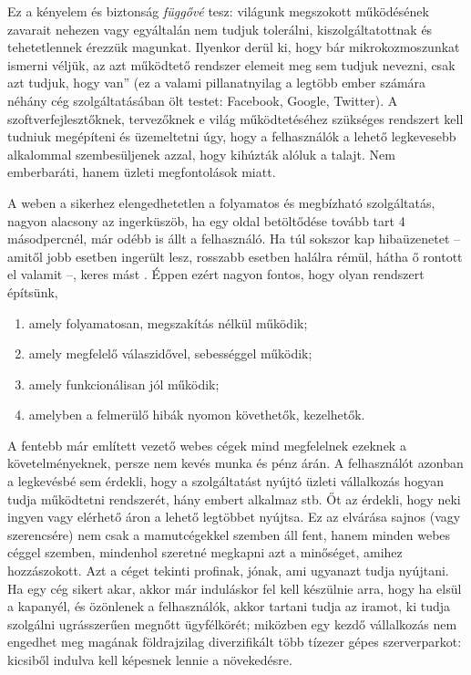 \documentclass[12pt, a4paper, oneside]{book}
\begin{document}
Ez a kényelem és biztonság \textit{függővé} tesz: világunk megszokott
működésének zavarait nehezen vagy egyáltalán nem tudjuk tolerálni,
kiszolgáltatottnak és tehetetlennek érezzük magunkat. Ilyenkor derül ki, hogy
bár mikrokozmoszunkat ismerni véljük, az azt működtető rendszer elemeit meg sem
tudjuk nevezni, csak azt tudjuk, hogy \glqq{}van\textquotedblright{} (ez a
valami pillanatnyilag a legtöbb ember számára néhány cég szolgáltatásában ölt
testet: Facebook, Google, Twitter). A szoftverfejlesztőknek, tervezőknek e
világ működtetéséhez szükséges rendszert kell tudniuk megépíteni és
üzemeltetni úgy, hogy a felhasználók a lehető legkevesebb alkalommal
szembesüljenek azzal, hogy kihúzták alóluk a talajt. Nem emberbaráti, hanem
üzleti megfontolások miatt.

A weben a sikerhez elengedhetetlen a folyamatos és megbízható szolgáltatás,
nagyon alacsony az ingerküszöb, ha egy oldal betöltődése tovább tart 4
másodpercnél, már odébb is állt a felhasználó.  Ha túl sokszor kap hibaüzenetet --
amitől jobb esetben ingerült lesz, rosszabb esetben halálra rémül, hátha ő
rontott el valamit --, keres mást \citep{AkamaiReport}.  Éppen ezért nagyon
fontos, hogy olyan rendszert építsünk,

\begin{enumerate} 
  \item amely folyamatosan, megszakítás nélkül működik;
  \item amely megfelelő válaszidővel, sebességgel működik;
  \item amely funkcionálisan jól működik;
  \item amelyben a felmerülő hibák nyomon követhetők, kezelhetők.
\end{enumerate}

A fentebb már említett vezető webes cégek mind megfelelnek ezeknek a
követelményeknek, persze nem kevés munka és pénz árán. A felhasználót azonban a
legkevésbé sem érdekli, hogy a szolgáltatást nyújtó üzleti vállalkozás hogyan
tudja működtetni rendszerét, hány embert alkalmaz stb. Őt az érdekli, hogy
neki ingyen vagy elérhető áron a lehető legtöbbet nyújtsa. Ez az elvárása
sajnos (vagy szerencsére) nem csak a mamutcégekkel szemben áll fent, hanem
minden webes céggel szemben, mindenhol szeretné megkapni azt a minőséget,
amihez hozzászokott. Azt a céget tekinti profinak, jónak, ami ugyanazt tudja
nyújtani. Ha egy cég sikert akar, akkor már induláskor fel kell készülnie arra,
hogy ha elsül a kapanyél, és özönlenek a felhasználók, akkor tartani tudja az
iramot, ki tudja szolgálni ugrásszerűen megnőtt ügyfélkörét; miközben egy kezdő
vállalkozás nem engedhet meg magának földrajzilag diverzifikált több tízezer
gépes szerverparkot: kicsiből indulva kell képesnek lennie a növekedésre.
\end{document}
